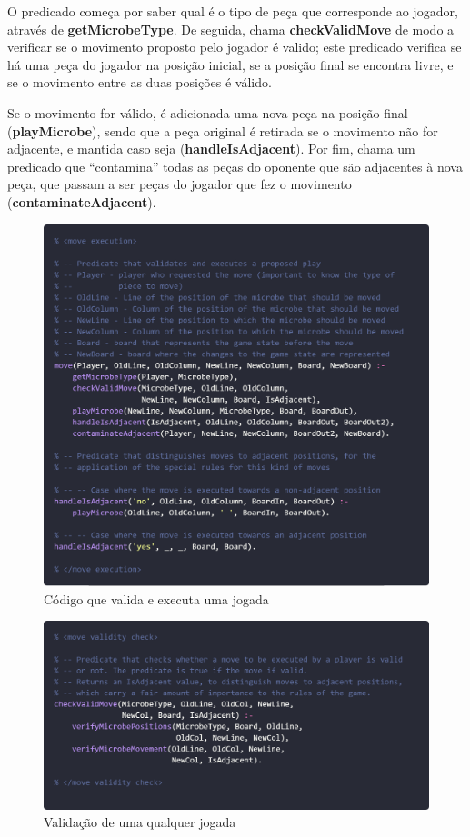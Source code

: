 \documentclass[a4paper]{article}
\begin{document}
\bigskip
O predicado começa por saber qual é o tipo de peça que corresponde ao jogador, através de \textbf{getMicrobeType}. De seguida, chama \textbf{checkValidMove} de modo a verificar se o movimento proposto pelo jogador é valido; este predicado verifica se há uma peça do jogador na posição inicial, se a posição final se encontra livre, e se o movimento entre as duas posições é válido.

\bigskip
Se o movimento for válido, é adicionada uma nova peça na posição final (\textbf{playMicrobe}), sendo que a peça original é retirada se o movimento não for adjacente, e mantida caso seja (\textbf{handleIsAdjacent}). Por fim, chama um predicado que “contamina” todas as peças do oponente que são adjacentes à nova peça, que passam a ser peças do jogador que fez o movimento (\textbf{contaminateAdjacent}).

\bigskip
\begin{figure}[hbp!]
    \centering
    \includegraphics[width=.87\linewidth]{prints/move-execution.png}
    \caption{Código que valida e executa uma jogada}
    \label{fig}
\end{figure}

\newpage
\begin{figure}[hbp!]
    \centering
    \includegraphics[width=.66\linewidth]{prints/move-validation.png}
    \caption{Validação de uma qualquer jogada}
    \label{fig}
\end{figure}
\end{document}
